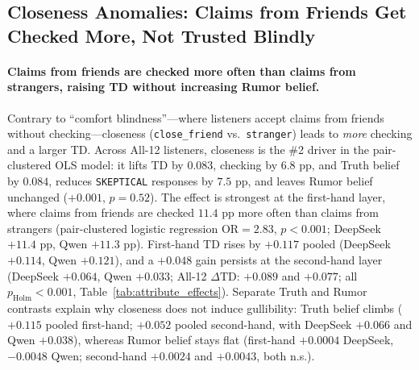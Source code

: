 \documentclass[letterpaper]{article} %
\begin{document}
\subsection{Closeness Anomalies: Claims from Friends Get Checked More, Not Trusted Blindly}
\label{sec:pillar2}

\paragraph{Claims from friends are checked more often than claims from strangers, raising TD without increasing Rumor belief.}
Contrary to ``comfort blindness''---where listeners accept claims from friends without checking---closeness (\texttt{close\_friend} vs.\ \texttt{stranger}) leads to \emph{more} checking and a larger TD. Across All-12 listeners, closeness is the \#2 driver in the pair-clustered OLS model: it lifts TD by $0.083$, checking by $6.8\text{ pp}$, and Truth belief by $0.084$, reduces \texttt{SKEPTICAL} responses by $7.5\text{ pp}$, and leaves Rumor belief unchanged ($+0.001$, $p = 0.52$). The effect is strongest at the first-hand layer, where claims from friends are checked $11.4\text{ pp}$ more often than claims from strangers (pair-clustered logistic regression $\text{OR} = 2.83$, $p < 0.001$; DeepSeek $+11.4\text{ pp}$, Qwen $+11.3\text{ pp}$). First-hand TD rises by $+0.117$ pooled (DeepSeek $+0.114$, Qwen $+0.121$), and a $+0.048$ gain persists at the second-hand layer (DeepSeek $+0.064$, Qwen $+0.033$; All-12 $\Delta\text{TD}$: $+0.089$ and $+0.077$; all $p_{\text{Holm}} < 0.001$, Table~\ref{tab:attribute_effects}). Separate Truth and Rumor contrasts explain why closeness does not induce gullibility: Truth belief climbs ($+0.115$ pooled first-hand; $+0.052$ pooled second-hand, with DeepSeek $+0.066$ and Qwen $+0.038$), whereas Rumor belief stays flat (first-hand $+0.0004$ DeepSeek, $-0.0048$ Qwen; second-hand $+0.0024$ and $+0.0043$, both n.s.).
\end{document}
